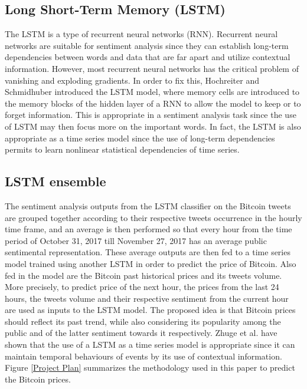\documentclass[conference]{IEEEtran}
\begin{document}
\subsection{Long Short-Term Memory (LSTM)}
\par The LSTM is a type of recurrent neural networks (RNN). Recurrent neural networks are suitable for sentiment analysis since they can establish long-term dependencies between words and data that are far apart and utilize contextual information. However, most recurrent neural networks has the critical problem of vanishing and exploding gradients. In order to fix this, Hochreiter and Schmidhuber \cite{LSTM} introduced the LSTM model, where memory cells are introduced to the memory blocks of the hidden layer of a RNN to allow the model to keep or to forget information. This is appropriate in a sentiment analysis task since the use of LSTM may then focus more on the important words. In fact, the LSTM is also appropriate as a time series model since the use of long-term dependencies permits to learn nonlinear statistical dependencies of time series.

\subsection{LSTM ensemble}
\par The sentiment analysis outputs from the LSTM classifier on the Bitcoin tweets are grouped together according to their respective tweets occurrence in the hourly time frame, and an average is then performed so that every hour from the time period of October 31, 2017 till November 27, 2017 has an average public sentimental representation. These average outputs are then fed to a time series model trained using another LSTM in order to predict the price of Bitcoin. Also fed in the model are the Bitcoin past historical prices and its tweets volume. More precisely, to predict price of the next hour, the prices from the last 24 hours, the tweets volume and their respective sentiment from the current hour are used as inputs to the LSTM model. The proposed idea is that Bitcoin prices should reflect its past trend, while also considering its popularity among the public and of the latter sentiment towards it respectively. Zhuge et al. \cite{LSTM Emotional} have shown that the use of a LSTM as a time series model is appropriate since it can maintain temporal behaviours of events by its use of contextual information. Figure \ref{Project Plan} summarizes the methodology used in this paper to predict the Bitcoin prices.
\end{document}
